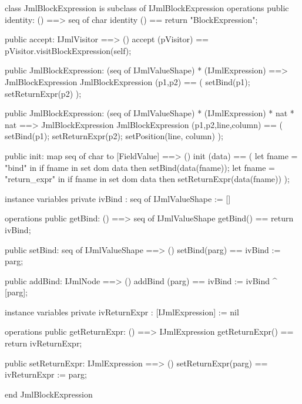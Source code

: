 \begin{vdm_al}
class JmlBlockExpression is subclass of IJmlBlockExpression
operations
  public identity: () ==> seq of char
  identity () == return "BlockExpression";

  public accept: IJmlVisitor ==> ()
  accept (pVisitor) == pVisitor.visitBlockExpression(self);

  public JmlBlockExpression:
    (seq of IJmlValueShape) *
    (IJmlExpression) ==> JmlBlockExpression
  JmlBlockExpression (p1,p2) == 
    ( setBind(p1);
      setReturnExpr(p2) );

  public JmlBlockExpression:
    (seq of IJmlValueShape) *
    (IJmlExpression) *
    nat *
    nat ==> JmlBlockExpression
  JmlBlockExpression (p1,p2,line,column) == 
    ( setBind(p1);
      setReturnExpr(p2);
      setPosition(line, column) );

  public init: map seq of char to [FieldValue] ==> ()
  init (data) ==
    ( let fname = "bind" in
        if fname in set dom data
        then setBind(data(fname));
      let fname = "return_expr" in
        if fname in set dom data
        then setReturnExpr(data(fname)) );

instance variables
  private ivBind : seq of IJmlValueShape := []

operations
  public getBind: () ==> seq of IJmlValueShape
  getBind() == return ivBind;

  public setBind: seq of IJmlValueShape ==> ()
  setBind(parg) == ivBind := parg;

  public addBind: IJmlNode ==> ()
  addBind (parg) == ivBind := ivBind ^ [parg];

instance variables
  private ivReturnExpr : [IJmlExpression] := nil

operations
  public getReturnExpr: () ==> IJmlExpression
  getReturnExpr() == return ivReturnExpr;

  public setReturnExpr: IJmlExpression ==> ()
  setReturnExpr(parg) == ivReturnExpr := parg;

end JmlBlockExpression
\end{vdm_al}

